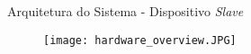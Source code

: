 \begin{frame}{Arquitetura do Sistema - Dispositivo \emph{Slave}}
	\begin{figure}
		\centering
		\texttt{[image: hardware\_overview.JPG]}
	\end{figure}
\end{frame}